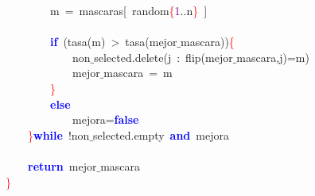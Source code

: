 \mbox{}\ \ \ \ \ \ \ \ m\ \textcolor{BrickRed}{=}\ mascaras\textcolor{BrickRed}{[}\ random\textcolor{Red}{\{}\textcolor{Purple}{1}\textcolor{BrickRed}{..}n\textcolor{Red}{\}}\ \textcolor{BrickRed}{]} \\
\mbox{} \\
\mbox{}\ \ \ \ \ \ \ \ \textbf{\textcolor{Blue}{if}}\ \textcolor{BrickRed}{(}tasa\textcolor{BrickRed}{(}m\textcolor{BrickRed}{)}\ \textcolor{BrickRed}{\textgreater{}}\ tasa\textcolor{BrickRed}{(}mejor$\_$mascara\textcolor{BrickRed}{))}\textcolor{Red}{\{} \\
\mbox{}\ \ \ \ \ \ \ \ \ \ \ \ non$\_$selected\textcolor{BrickRed}{.}delete\textcolor{BrickRed}{(}j\ \textcolor{BrickRed}{:}\ flip\textcolor{BrickRed}{(}mejor$\_$mascara\textcolor{BrickRed}{,}j\textcolor{BrickRed}{)=}m\textcolor{BrickRed}{)} \\
\mbox{}\ \ \ \ \ \ \ \ \ \ \ \ mejor$\_$mascara\ \textcolor{BrickRed}{=}\ m \\
\mbox{}\ \ \ \ \ \ \ \ \textcolor{Red}{\}} \\
\mbox{}\ \ \ \ \ \ \ \ \textbf{\textcolor{Blue}{else}} \\
\mbox{}\ \ \ \ \ \ \ \ \ \ \ \ mejora\textcolor{BrickRed}{=}\textbf{\textcolor{Blue}{false}} \\
\mbox{}\ \ \ \ \textcolor{Red}{\}}\textbf{\textcolor{Blue}{while}}\ \textcolor{BrickRed}{!}non$\_$selected\textcolor{BrickRed}{.}empty\ \textbf{\textcolor{Blue}{and}}\ mejora \\
\mbox{} \\
\mbox{}\ \ \ \ \textbf{\textcolor{Blue}{return}}\ mejor$\_$mascara \\
\mbox{}\textcolor{Red}{\}} \\
\mbox{}

